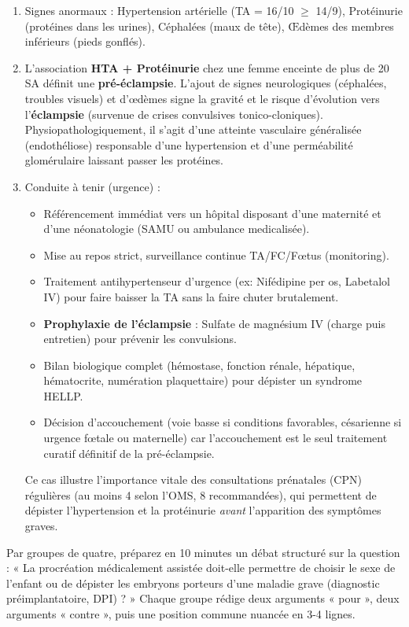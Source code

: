 \documentclass[11pt]{article}
\newcommand{\cle}[1]{{\popxbold\color{popdark}#1}}
\begin{document}
\begin{corrige}
\begin{enumerate}
\item Signes anormaux : Hypertension artérielle (TA = 16/10 $\ge$ 14/9), Protéinurie (protéines dans les urines), Céphalées (maux de tête), Œdèmes des membres inférieurs (pieds gonflés).
\item L'association \textbf{HTA + Protéinurie} chez une femme enceinte de plus de 20 SA définit une \textbf{pré-éclampsie}. L'ajout de signes neurologiques (céphalées, troubles visuels) et d'œdèmes signe la gravité et le risque d'évolution vers l'\textbf{éclampsie} (survenue de crises convulsives tonico-cloniques). Physiopathologiquement, il s'agit d'une atteinte vasculaire généralisée (endothéliose) responsable d'une hypertension et d'une perméabilité glomérulaire laissant passer les protéines.
\item Conduite à tenir (urgence) :
\begin{itemize}
\item Référencement immédiat vers un hôpital disposant d'une maternité et d'une néonatologie (SAMU ou ambulance medicalisée).
\item Mise au repos strict, surveillance continue TA/FC/Fœtus (monitoring).
\item Traitement antihypertenseur d'urgence (ex: Nifédipine per os, Labetalol IV) pour faire baisser la TA sans la faire chuter brutalement.
\item \textbf{Prophylaxie de l'éclampsie} : Sulfate de magnésium IV (charge puis entretien) pour prévenir les convulsions.
\item Bilan biologique complet (hémostase, fonction rénale, hépatique, hématocrite, numération plaquettaire) pour dépister un syndrome HELLP.
\item Décision d'accouchement (voie basse si conditions favorables, césarienne si urgence fœtale ou maternelle) car l'accouchement est le seul traitement curatif définitif de la pré-éclampsie.
\end{itemize}
Ce cas illustre l'importance vitale des \cle{consultations prénatales} (CPN) régulières (au moins 4 selon l'OMS, 8 recommandées), qui permettent de dépister l'hypertension et la protéinurie \emph{avant} l'apparition des symptômes graves.
\end{enumerate}
\end{corrige}

\begin{exercice}
Par groupes de quatre, préparez en 10 minutes un débat structuré sur la question : « La procréation médicalement assistée doit-elle permettre de choisir le sexe de l'enfant ou de dépister les embryons porteurs d'une maladie grave (diagnostic préimplantatoire, DPI) ? » Chaque groupe rédige deux arguments « pour », deux arguments « contre », puis une position commune nuancée en 3-4 lignes.
\end{exercice}
\end{document}
